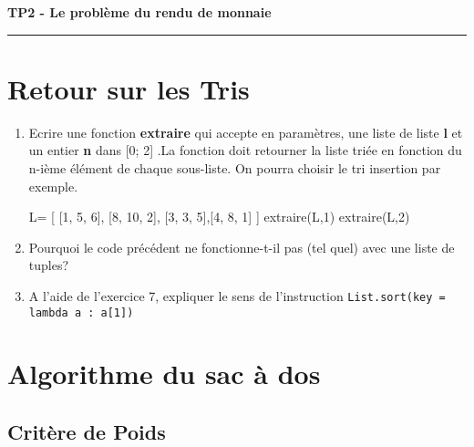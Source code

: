 \documentclass[12pt,french]{article}
\newcounter{sf}
\begin{document}
    \chead{}
      \renewcommand{\headrulewidth}{0.5pt}
      \lfoot{                      }
    \pagestyle{fancy}
    \renewcommand{\footrulewidth}{0.4pt}
\begin{center}
\textbf{\Large{TP2 - Le problème du rendu de monnaie}}\end{center}
\hrule
\medskip
\section{Retour sur les Tris}
\begin{enumerate}
	
	\item Ecrire une fonction \textbf{extraire} qui accepte en paramètres, une liste de liste  \textbf{l} et un entier \textbf{n}  dans [0; 2] .La fonction doit retourner la liste triée en fonction du n-ième  élément de chaque sous-liste. On pourra choisir le tri insertion par exemple.
	\begin{tcolorbox}[enhanced,attach boxed title to top center={yshift=-3mm,yshifttext=-1mm},
		colback=green!5!white,colframe=green!75!black,colbacktitle=green!25!black,
		title=Console Python, fonttitle=\bfseries,
		boxed title style={size=small,colframe=blue!25!black} ]
		\begin{pyconsole}
L= [ [1, 5, 6], [8, 10, 2], [3, 3, 5],[4, 8, 1] ]
extraire(L,1)
extraire(L,2)
		\end{pyconsole}
	\end{tcolorbox}
	
	
	
	\item Pourquoi le code précédent ne fonctionne-t-il pas (tel quel) avec une liste de tuples?

	\item A l'aide de l'exercice 7, expliquer le sens de l'instruction \texttt{List.sort(key = lambda a : a[1]) }
\end{enumerate}	

\section{Algorithme du sac à dos}
	\subsection{Critère de Poids}
	
\end{document}
